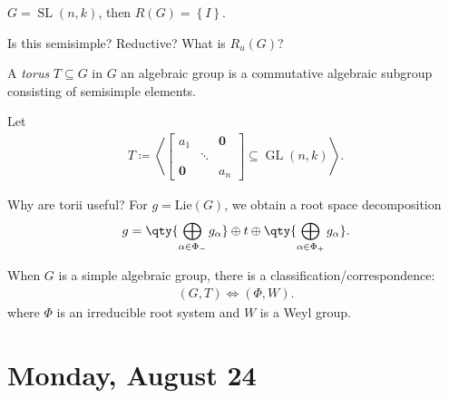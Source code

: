 \begin{example}

\(G = {\operatorname{SL}}(n , k)\), then \(R(G) = \left\{{I}\right\}\).

\begin{exercise}

Is this semisimple? Reductive? What is \(R_u(G)\)?

\end{exercise}

\end{example}

\begin{definition}[Torus]

A \emph{torus} \(T\subseteq G\) in \(G\) an algebraic group is a
commutative algebraic subgroup consisting of semisimple elements.

\end{definition}

\begin{example}

Let
\begin{align*}  
T \coloneqq
\left\langle{
\begin{bmatrix}
a_1 &  & \mathbf 0\\
 & \ddots &  \\
\mathbf 0 &  & a_n
\end{bmatrix} \subseteq \operatorname{GL}(n ,k)
}\right\rangle
.\end{align*}

\end{example}

\begin{remark}

Why are torii useful? For \(g = \mathrm{Lie}(G)\), we obtain a root
space decomposition
\begin{align*}  
g = 
\qty{\bigoplus_{\alpha \in \Phi_- }g_\alpha} \oplus 
t \oplus
\qty{\bigoplus_{\alpha \in \Phi_+ }g_\alpha} 
.\end{align*}

When \(G\) is a simple algebraic group, there is a
classification/correspondence:
\begin{align*}  
(G, T) \iff (\Phi, W)
.\end{align*}
where \(\Phi\) is an irreducible root system and \(W\) is a Weyl group.

\end{remark}

\hypertarget{monday-august-24}{%
\section{Monday, August 24}\label{monday-august-24}}

